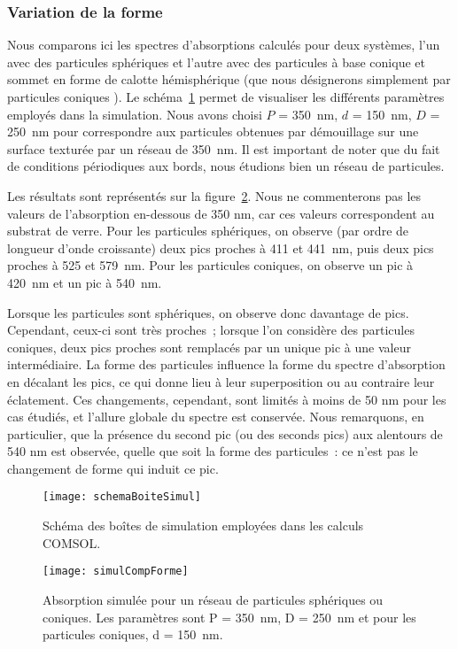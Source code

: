 	\subsubsection{Variation de la forme}
Nous comparons ici les spectres d'absorptions calculés pour deux systèmes, l'un avec des particules sphériques et l'autre avec des particules à base conique et sommet en forme de calotte hémisphérique (que nous désignerons simplement par \og particules coniques \fg). Le schéma~\ref{schemaBoiteSimul} permet de visualiser les différents paramètres employés dans la simulation. Nous avons choisi $P$ = 350~nm, $d$ = 150~nm, $D$ = 250~nm pour correspondre aux particules obtenues par démouillage sur une surface texturée par un réseau de 350~nm. Il est important de noter que du fait de conditions périodiques aux bords, nous étudions bien un réseau de particules.\par 
Les résultats sont représentés sur la figure~\ref{simulCompForme}. Nous ne commenterons pas les valeurs de l'absorption en-dessous de 350 nm, car ces valeurs correspondent au substrat de verre. Pour les particules sphériques, on observe (par ordre de longueur d'onde croissante) deux pics proches à 411 et 441~nm, puis deux pics proches à 525 et 579~nm. Pour les particules coniques, on observe un pic à 420~nm et un pic à 540~nm.\par 
Lorsque les particules sont sphériques, on observe donc davantage de pics. Cependant, ceux-ci sont très proches~; lorsque l'on considère des particules coniques, deux pics proches sont remplacés par un unique pic à une valeur intermédiaire. La forme des particules influence la forme du spectre d'absorption en décalant les pics, ce qui donne lieu à leur superposition ou au contraire leur éclatement. Ces changements, cependant, sont limités à moins de 50 nm pour les cas étudiés, et l'allure globale du spectre est conservée. Nous remarquons, en particulier, que la présence du second pic (ou des seconds pics) aux alentours de 540 nm est observée, quelle que soit la forme des particules~: ce n'est pas le changement de forme qui induit ce pic.\par 
\begin{figure}[!htb]
\centering
\texttt{[image: schemaBoiteSimul]}
\caption{Schéma des boîtes de simulation employées dans les calculs COMSOL.}
\label{schemaBoiteSimul}
\end{figure}
\begin{figure}[!htb]
\centering
\texttt{[image: simulCompForme]}
\caption{Absorption simulée pour un réseau de particules sphériques ou coniques. Les paramètres sont P = 350~nm, D = 250~nm et pour les particules coniques, d = 150~nm.}
\label{simulCompForme}
\end{figure}
